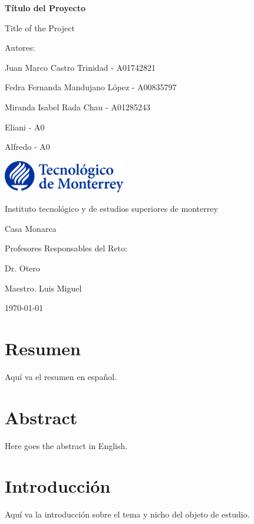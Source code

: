 \documentclass[a4paper,12pt]{report}
\begin{document}

\begin{titlepage}
    \centering
    {\Huge \bfseries Título del Proyecto \par}
    {\Large Title of the Project \par}
    \vspace{1cm}
    {\Large Autores: \par}
    \vspace{0.5cm}
    {\large Juan Marco Castro Trinidad - A01742821 \par}
    {\large Fedra Fernanda Mandujano López - A00835797 \par}
    {\large Miranda Isabel Rada Chau - A01285243 \par}
    {\large Eliani - A0 \par}
    {\large Alfredo - A0 \par}
    \vfill
    \includegraphics[width=0.4\textwidth]{logo_tec.png} \par
    \vspace{0.5cm}
    {\Large Instituto tecnológico y de estudios superiores de monterrey  \par}
    {\Large Casa Monarca \par}
    \vfill
    {\Large Profesores Responsables del Reto: \par}
    {\large Dr. Otero \par}
    {\large Maestro. Luis Miguel \par}
    \vfill
    {\large \today \par}
\end{titlepage}

\tableofcontents
\newpage

\chapter*{Resumen}
Aquí va el resumen en español.

\chapter*{Abstract}
Here goes the abstract in English.

\chapter{Introducción}
Aquí va la introducción sobre el tema y nicho del objeto de estudio.
\end{document}
